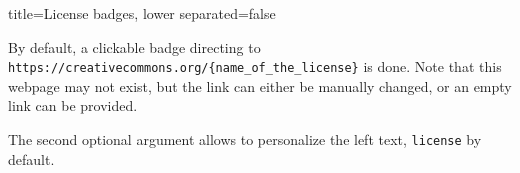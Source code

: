 \begin{tcblisting}{title={License badges}, lower separated=false}
\end{tcblisting}

By default, a clickable badge directing to \texttt{https://creativecommons.org/\{name\_of\_the\_license\}} is done.
Note that this webpage may not exist, but the link can either be manually changed, or an empty link can be provided.

The second optional argument allows to personalize the left text, \texttt{license} by default.

